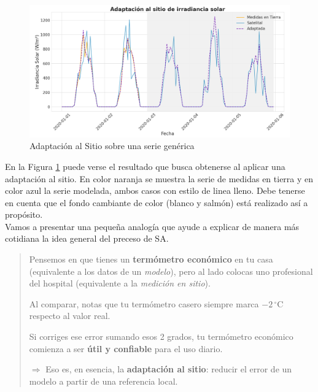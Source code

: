 \begin{figure}
    \centering
    \includegraphics[width=0.97\linewidth]{figuras/siteAdaptation.png}
    \caption{Adaptación al Sitio sobre una serie genérica}
    \label{fig:site-adapation}
\end{figure}

En la Figura \ref{fig:site-adapation} puede verse el resultado que busca obtenerse al aplicar una adaptación al sitio. En color naranja se muestra la serie de medidas en tierra y en color azul la serie modelada, ambos casos con estilo de linea lleno. Debe tenerse en cuenta que el fondo cambiante de color (blanco y salmón) está realizado así a propósito.\\ 

Vamos a presentar una pequeña analogía que ayude a explicar de manera más cotidiana la idea general del preceso de SA.
\begin{quote}
Pensemos en que tienes un \textbf{termómetro económico} en tu casa (equivalente a los datos de un \textit{modelo}), 
pero al lado colocas uno profesional del hospital (equivalente a la \textit{medición en sitio}).  

Al comparar, notas que tu termómetro casero siempre marca \(-2\,^{\circ}\mathrm{C}\) respecto al valor real.  

Si corriges ese error sumando esos 2 grados, tu termómetro económico comienza a ser \textbf{útil y confiable} para el uso diario.  

\medskip
$\Rightarrow$ Eso es, en esencia, la \textbf{adaptación al sitio}: reducir el error de un modelo a partir de  una referencia local.
\end{quote}



